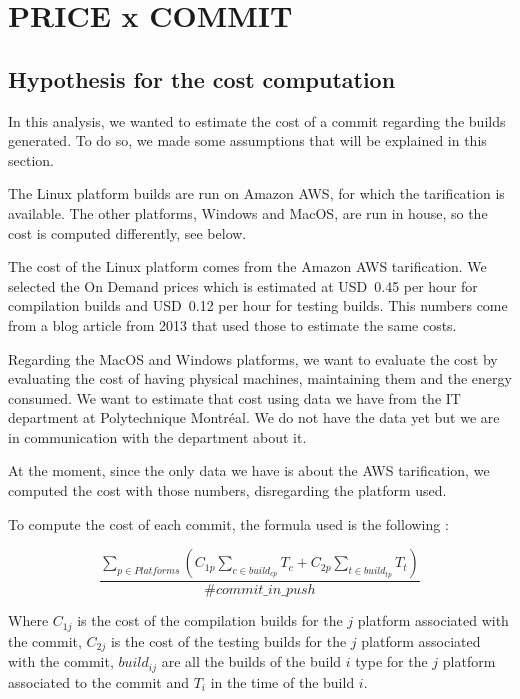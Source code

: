 \section{PRICE x COMMIT}

\subsection{Hypothesis for the cost computation}

In this analysis, we wanted to estimate the cost of a commit regarding the builds generated. To do so, we made some assumptions that will be explained in this section.

The Linux platform builds are run on Amazon AWS, for which the tarification is available. The other platforms, Windows and MacOS, are run in house, so the cost is computed differently, see below.

The cost of the Linux platform comes from the Amazon AWS tarification. We selected the On Demand prices which is estimated at USD~0.45 per hour for compilation builds and USD~0.12 per hour for testing builds. This numbers come from a blog article from 2013 that used those to estimate the same costs.

Regarding the MacOS and Windows platforms, we want to evaluate the cost by evaluating the cost of having physical machines, maintaining them and the energy consumed. We want to estimate that cost using data we have from the IT department at Polytechnique Montréal. We do not have the data yet but we are in communication with the department about it. 


At the moment, since the only data we have is about the AWS tarification, we computed the cost with those numbers, disregarding the platform used.

To compute the cost of each commit, the formula used is the following :

$$\frac{\sum_{p\in Platforms} (C_{1p}\sum_{c \in build_{cp}} T_{c} + C_{2p}\sum_{t \in build_{tp}} T_{t})}{\#commit\_in\_push}$$

Where $C_{1j}$ is the cost of the compilation builds for the $j$ platform associated with the commit, $C_{2j}$ is the cost of the testing builds for the $j$ platform associated with the commit, $build_{i j}$ are all the builds of the build $i$ type for the $j$ platform associated to the commit and $T_i$ in the time of the build $i$.




